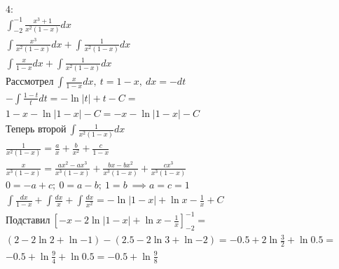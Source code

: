 \documentclass{report}
\begin{document}
\begin{multline}
    \text{4:}\\
    \int_{-2}^{-1} \frac{x^{3} + 1}{x^{2}(1 - x)} dx\\
    \int \frac{x^{3}}{x^{2}(1 - x)} dx + \int \frac{1}{x^{2}(1 - x)} dx\\
    \int \frac{x}{1 - x} dx + \int \frac{1}{x^{2}(1 - x)} dx\\
    \text{Рассмотрел}\ \int \frac{x}{1 - x} dx,\ t = 1 - x,\ dx = -dt\\
    - \int \frac{1 - t}{t} dt = - \ln{|t|} + t - C =\\
    1 - x - \ln{|1 - x|} - C = -x - \ln{|1 - x|} -C\\
    \text{Теперь второй}\  \int \frac{1}{x^{2}(1 - x)} dx\\
    \frac{1}{x^{2} (1 - x)} = \frac{a}{x} + \frac{b}{x^{2}} + \frac{c}{1 - x}\\
    \frac{x}{x^{3} (1 - x)} = \frac{ax^{2} - ax^3}{x^{3} (1 - x)} + \frac{bx - bx^{2}}{x^{3} (1 - x)} + \frac{cx^3}{x^{3} (1 - x)}\\
    0 = -a + c;\ 0 = a - b;\ 1 = b\ \implies a = c = 1\\
    \int \frac{dx}{1 - x} + \int \frac{dx}{x} + \int \frac{dx}{x^{2}} = -\ln{|1 - x|} + \ln{x} - \frac{1}{x} + C\\
    \text{Подставил}\ [-x - 2\ln{|1 - x|} + \ln{x} - \frac{1}{x}]_{-2}^{-1} =\\
    (2 - 2\ln{2} + \ln{-1}) - (2.5 - 2\ln{3} + \ln{-2}) = -0.5 + 2\ln{\frac{3}{2}} + \ln{0.5} =\\
    -0.5 + \ln{\frac{9}{4}} + \ln{0.5} = -0.5 + \ln{\frac{9}{8}}\\
\end{multline}
\end{document}
